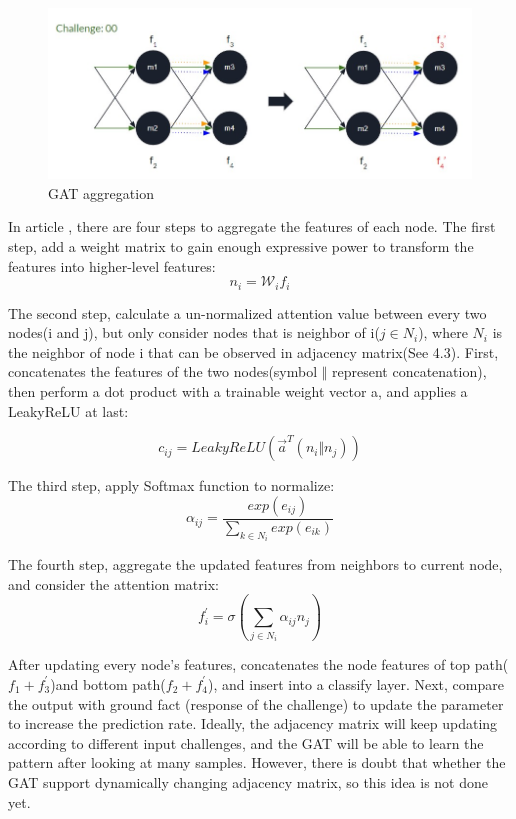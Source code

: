 \begin{figure}[htp]
    \centering
    \includegraphics[width=12cm]{figures/figure12.jpg}
    \caption{GAT aggregation}
    \label{fig:figure12}
    \end{figure}

In article \cite{Reference10}, there are four steps to aggregate the features of each node. The first step, add a weight matrix to gain enough expressive power to transform the features into higher-level features:
\begin{equation}
    n_i = \mathcal{W}_if_i
\end{equation}

The second step, calculate a un-normalized attention value between every two nodes(i and j), but only consider nodes that is neighbor of i($j \in N_i$), where $N_i$ is the neighbor of node i that can be observed in 
adjacency matrix(See 4.3). First, concatenates the features of the two nodes(symbol $\Vert$ represent concatenation), then perform a dot product with a trainable weight vector a, and applies a LeakyReLU at last:

\begin{equation}
    c_{ij} = LeakyReLU(\overrightarrow{a}^T(n_i \Vert n_j))
\end{equation}

The third step, apply Softmax function to normalize:
\begin{equation}
    \alpha_{ij} = \frac{exp(e_{ij})}{\sum_{k \in N_i}  exp(e_{ik})} 
\end{equation}

The fourth step, aggregate the updated features from neighbors to current node, and consider the attention matrix:
\begin{equation}
    f_i^{'} = \sigma (\sum_{j \in N_i} \alpha_{ij}n_j)
\end{equation}

After updating every node's features, concatenates the node features of top path($f_1+f_3^{'}$)and bottom path($f_2+f_4^{'}$), and insert into a classify layer. Next, compare the output with ground fact
(response of the challenge) to update the parameter to increase the prediction rate. Ideally, the adjacency matrix will keep updating according to different input challenges, and the GAT will be able to 
learn the pattern after looking at many samples. However, there is doubt that whether the GAT support dynamically changing adjacency matrix, so this idea is not done yet.





